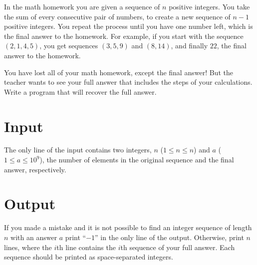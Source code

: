 
In the math homework you are given a sequence of $n$ positive integers.
You take the sum of every consecutive pair of numbers, to create a new sequence of $n - 1$ positive integers.
You repeat the process until you have one number left, which is the final answer to the homework.
For example, if you start with the sequence $(2, 1, 4, 5)$, you get sequences $(3, 5, 9)$ and $(8, 14)$, and finally $22$, the final answer to the homework.

You have lost all of your math homework, except the final answer!
But the teacher wants to see your full answer that includes the steps of your calculations.
Write a program that will recover the full answer.

\section*{Input}
The only line of the input contains two integers, $n$ ($1 \leq n \leq n$) and $a$ ($1 \leq a \leq 10^9$), the number of elements in the original sequence and the final answer, respectively.

\section*{Output}
If you made a mistake and it is not possible to find an integer sequence of length $n$ with an answer $a$ print ``$-1$'' in the only line of the output.
Otherwise, print $n$ lines, where the $i$th line contains the $i$th sequence of your full answer.
Each sequence should be printed as space-separated integers.
